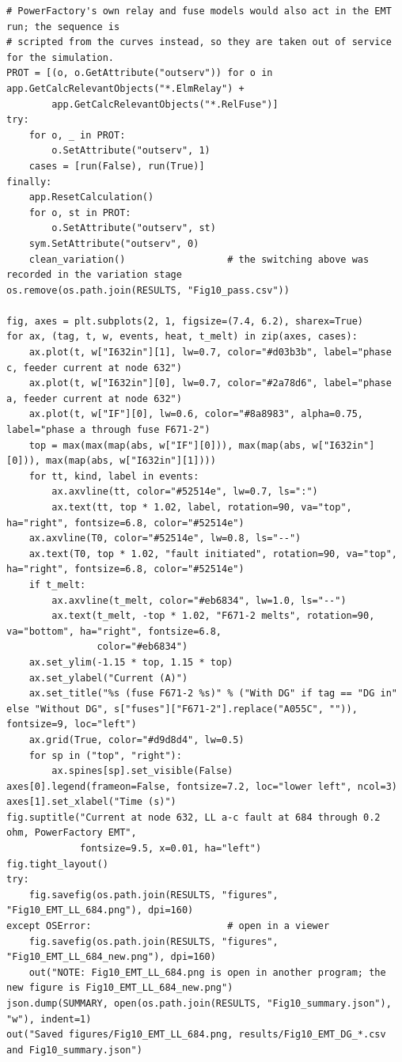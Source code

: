 \documentclass[12pt,a4paper]{article}
\begin{document}
\begin{lstlisting}
# PowerFactory's own relay and fuse models would also act in the EMT run; the sequence is
# scripted from the curves instead, so they are taken out of service for the simulation.
PROT = [(o, o.GetAttribute("outserv")) for o in app.GetCalcRelevantObjects("*.ElmRelay") +
        app.GetCalcRelevantObjects("*.RelFuse")]
try:
    for o, _ in PROT:
        o.SetAttribute("outserv", 1)
    cases = [run(False), run(True)]
finally:
    app.ResetCalculation()
    for o, st in PROT:
        o.SetAttribute("outserv", st)
    sym.SetAttribute("outserv", 0)
    clean_variation()                  # the switching above was recorded in the variation stage
os.remove(os.path.join(RESULTS, "Fig10_pass.csv"))

fig, axes = plt.subplots(2, 1, figsize=(7.4, 6.2), sharex=True)
for ax, (tag, t, w, events, heat, t_melt) in zip(axes, cases):
    ax.plot(t, w["I632in"][1], lw=0.7, color="#d03b3b", label="phase c, feeder current at node 632")
    ax.plot(t, w["I632in"][0], lw=0.7, color="#2a78d6", label="phase a, feeder current at node 632")
    ax.plot(t, w["IF"][0], lw=0.6, color="#8a8983", alpha=0.75, label="phase a through fuse F671-2")
    top = max(max(map(abs, w["IF"][0])), max(map(abs, w["I632in"][0])), max(map(abs, w["I632in"][1])))
    for tt, kind, label in events:
        ax.axvline(tt, color="#52514e", lw=0.7, ls=":")
        ax.text(tt, top * 1.02, label, rotation=90, va="top", ha="right", fontsize=6.8, color="#52514e")
    ax.axvline(T0, color="#52514e", lw=0.8, ls="--")
    ax.text(T0, top * 1.02, "fault initiated", rotation=90, va="top", ha="right", fontsize=6.8, color="#52514e")
    if t_melt:
        ax.axvline(t_melt, color="#eb6834", lw=1.0, ls="--")
        ax.text(t_melt, -top * 1.02, "F671-2 melts", rotation=90, va="bottom", ha="right", fontsize=6.8,
                color="#eb6834")
    ax.set_ylim(-1.15 * top, 1.15 * top)
    ax.set_ylabel("Current (A)")
    ax.set_title("%s (fuse F671-2 %s)" % ("With DG" if tag == "DG in" else "Without DG", s["fuses"]["F671-2"].replace("A055C", "")), fontsize=9, loc="left")
    ax.grid(True, color="#d9d8d4", lw=0.5)
    for sp in ("top", "right"):
        ax.spines[sp].set_visible(False)
axes[0].legend(frameon=False, fontsize=7.2, loc="lower left", ncol=3)
axes[1].set_xlabel("Time (s)")
fig.suptitle("Current at node 632, LL a-c fault at 684 through 0.2 ohm, PowerFactory EMT",
             fontsize=9.5, x=0.01, ha="left")
fig.tight_layout()
try:
    fig.savefig(os.path.join(RESULTS, "figures", "Fig10_EMT_LL_684.png"), dpi=160)
except OSError:                        # open in a viewer
    fig.savefig(os.path.join(RESULTS, "figures", "Fig10_EMT_LL_684_new.png"), dpi=160)
    out("NOTE: Fig10_EMT_LL_684.png is open in another program; the new figure is Fig10_EMT_LL_684_new.png")
json.dump(SUMMARY, open(os.path.join(RESULTS, "Fig10_summary.json"), "w"), indent=1)
out("Saved figures/Fig10_EMT_LL_684.png, results/Fig10_EMT_DG_*.csv and Fig10_summary.json")
\end{lstlisting}
\end{document}
